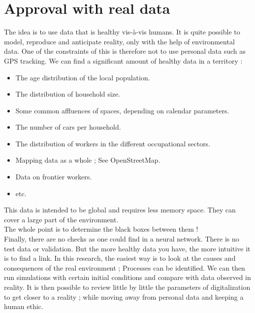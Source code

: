 \chapter{Approval with real data}

The idea is to use data that is healthy vis-à-vis humans. It is quite possible to model, reproduce and anticipate reality, only with the help of environmental data. One of the constraints of this is therefore not to use personal data such as GPS tracking. We can find a significant amount of healthy data in a territory :\\

\begin{itemize}
\item The age distribution of the local population.
\item The distribution of household size.
\item Some common affluences of spaces, depending on calendar parameters.
\item The number of cars per household.
\item The distribution of workers in the different occupational sectors.
\item Mapping data as a whole ; See OpenStreetMap.
\item Data on frontier workers.
\item etc.\\
\end{itemize}


This data is intended to be global and requires less memory space. They can cover a large part of the environment.\\

The whole point is to determine the black boxes between them !\\
Finally, there are no checks as one could find in a neural network. There is no test data or validation. But the more healthy data you have, the more intuitive it is to find a link. In this research, the easiest way is to look at the causes and consequences of the real environment ; Processes can be identified. We can then run simulations with certain initial conditions and compare with data observed in reality. It is then possible to review little by little the parameters of digitalization to get closer to a reality ; while moving away from personal data and keeping a human ethic.